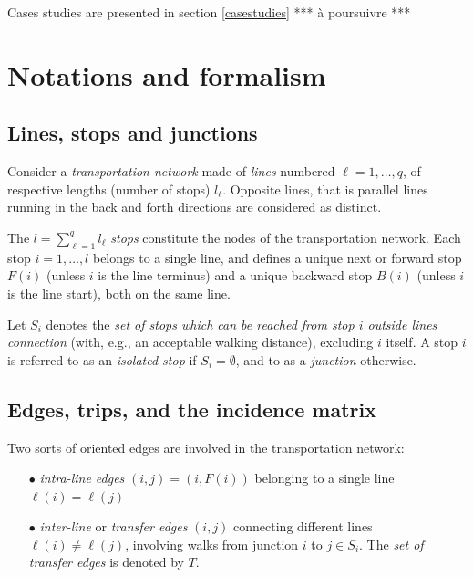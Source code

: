\documentclass{bmcart}
\begin{document}
Cases studies are presented in section \ref{casestudies} *** à poursuivre *** 






\section{Notations and formalism}
\label{notforma}
\subsection{Lines, stops  and junctions}
\label{Lines and junctions}
Consider a \emph{transportation network} made of \emph{lines} numbered $\ell=1,\ldots, q$, of respective lengths (number of stops) $l_\ell$.  Opposite lines, that is parallel lines running in the back and forth directions are considered as distinct. 

The $l=\sum_{\ell=1}^ql_\ell$ \emph{stops} constitute the nodes of the transportation network. Each stop $i=1,\ldots,l$ belongs to a single line, and defines a unique next or forward stop $F(i)$ (unless $i$ is the line terminus) and a unique backward stop $B(i)$ (unless $i$ is the line start), both on the same line.  

Let $S_i$ denotes the \emph{set of stops which can be reached from stop $i$ outside lines connection} (with, e.g., an acceptable walking distance), excluding $i$ itself. A stop $i$ is referred to as an \emph{isolated stop} if $S_i=\emptyset$, and to as a \emph{junction} otherwise. 

\subsection{Edges, trips, and the incidence matrix}
\label{Line edges, transfer edges and trips}

Two sorts of oriented edges are involved in the transportation network: 
\begin{enumerate}
  \item[$\bullet$] \emph{intra-line edges} $(i,j)=(i,F(i))$ belonging to a single line  $\ell(i)=\ell(j)$
  \item[$\bullet$] \emph{inter-line} or \emph{transfer edges} $(i,j)$ connecting different lines $\ell(i)\neq \ell(j)$, involving walks from junction $i$ to $j\in S_i$. The \emph{set of transfer edges} is denoted by $T$.
\end{enumerate}
\end{document}

